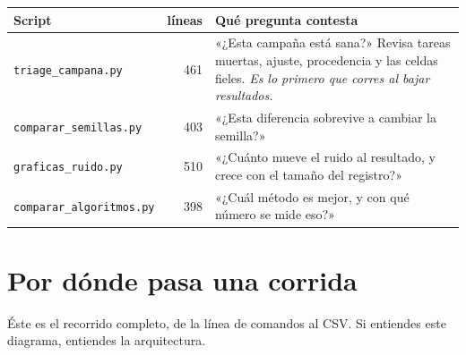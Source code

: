 \documentclass[11pt,a4paper]{article}
\newcommand{\M}[1]{\texttt{#1}}
\begin{document}
\begin{center}
\small
\begin{tabular}{@{}lrp{7.4cm}@{}}
\toprule
\textbf{Script} & \textbf{líneas} & \textbf{Qué pregunta contesta} \\
\midrule
\M{triage\_campana.py} & 461
  & «¿Esta campaña está sana?» Revisa tareas muertas, ajuste, procedencia y
    las celdas fieles. \emph{Es lo primero que corres al bajar
    resultados.} \\
\addlinespace
\M{comparar\_semillas.py} & 403
  & «¿Esta diferencia sobrevive a cambiar la semilla?» \\
\addlinespace
\M{graficas\_ruido.py} & 510
  & «¿Cuánto mueve el ruido al resultado, y crece con el tamaño del
    registro?» \\
\addlinespace
\M{comparar\_algoritmos.py} & 398
  & «¿Cuál método es mejor, y con qué número se mide eso?» \\
\bottomrule
\end{tabular}
\end{center}

\section{Por dónde pasa una corrida}

Éste es el recorrido completo, de la línea de comandos al CSV. Si entiendes
este diagrama, entiendes la arquitectura.
\end{document}
